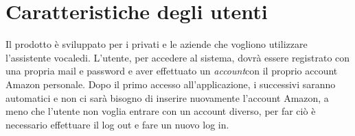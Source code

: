 \section{Caratteristiche degli utenti}
Il prodotto è sviluppato per i privati e le aziende che vogliono utilizzare l'assistente vocaledi.
L'utente, per accedere al sistema, dovrà essere registrato con una propria mail e password e aver effettuato un \textit{account}con il proprio account Amazon personale. Dopo il primo accesso all'applicazione, i successivi saranno automatici e non ci sarà bisogno di inserire nuovamente l'account Amazon, a meno che l'utente non voglia entrare con un account diverso, per far ciò è necessario effettuare il log out e fare un nuovo log in.

